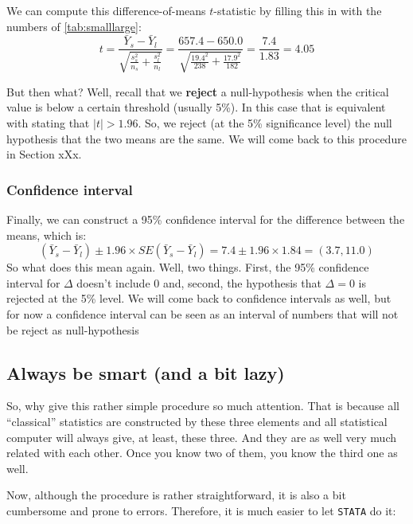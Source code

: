\documentclass[
]{book}
\begin{document}
We can compute this difference-of-means \(t\)-statistic by filling this in with the numbers of \ref{tab:smalllarge}:
\begin{equation}
t = \frac{\bar{Y}_s - \bar{Y}_l}{\sqrt{\frac{s^2_s}{n_s} +\frac{s^2_l}{n_l} }}  = \frac{657.4 - 650.0}{\sqrt{\frac{19.4^2}{238} +\frac{17.9^2}{182} }} = \frac{7.4}{1.83} = 4.05
\end{equation}

But then what? Well, recall that we \textbf{reject} a null-hypothesis when the critical value is below a certain threshold (usually 5\%). In this case that is equivalent with stating that \(|t|>1.96\). So, we reject (at the 5\% significance level) the null hypothesis that the two means are the same. We will come back to this procedure in Section xXx.

\hypertarget{confidence-interval}{%
\subsubsection{Confidence interval}\label{confidence-interval}}

Finally, we can construct a 95\% confidence interval for the difference between the means, which is:
\begin{equation}
(\bar{Y}_s - \bar{Y}_l)\pm 1.96 \times SE(\bar{Y}_s - \bar{Y}_l) = 7.4 \pm 1.96 \times 1.84 = (3.7, 11.0)
\label{eq:cilarge}
\end{equation}
So what does this mean again. Well, two things. First, the 95\% confidence interval for \(\Delta\) doesn't include 0 and, second, the hypothesis that \(\Delta = 0\) is rejected at the 5\% level. We will come back to confidence intervals as well, but for now a confidence interval can be seen as an interval of numbers that will not be reject as null-hypothesis

\hypertarget{always-be-smart-and-a-bit-lazy}{%
\subsection{Always be smart (and a bit lazy)}\label{always-be-smart-and-a-bit-lazy}}

So, why give this rather simple procedure so much attention. That is because all ``classical'' statistics are constructed by these three elements and all statistical computer will always give, at least, these three. And they are as well very much related with each other. Once you know two of them, you know the third one as well.

Now, although the procedure is rather straightforward, it is also a bit cumbersome and prone to errors. Therefore, it is much easier to let \texttt{STATA} do it:
\end{document}
